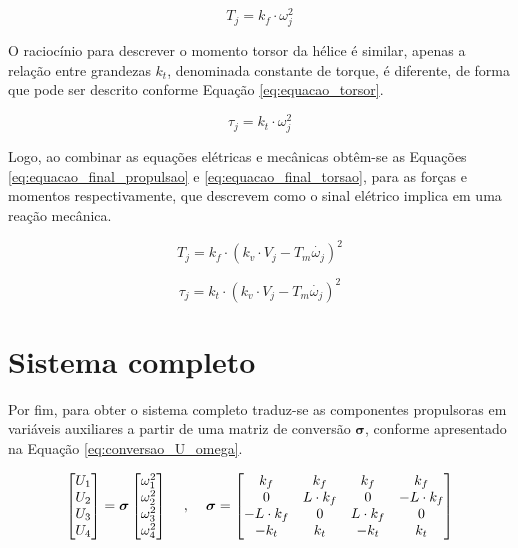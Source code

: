 \documentclass[main.tex]{subfiles}
\begin{document}
\begin{equation}\label{eq:equacao_propulsao}
	T_j = k_f \cdot \omega_j^2
\end{equation}

O raciocínio para descrever o momento torsor da hélice é similar, apenas a relação entre grandezas $k_t$, denominada constante de torque, é diferente, de forma que pode ser descrito conforme Equação \ref{eq:equacao_torsor}.

\begin{equation}\label{eq:equacao_torsor}
	\tau_j = k_t \cdot \omega_j^2
\end{equation}

Logo, ao combinar as equações elétricas e mecânicas obtêm-se as Equações \ref{eq:equacao_final_propulsao} e \ref{eq:equacao_final_torsao}, para as forças e momentos respectivamente, que descrevem como o sinal elétrico implica em uma reação mecânica.

\begin{equation}\label{eq:equacao_final_propulsao}
	T_j = k_f \cdot (k_v \cdot V_j - T_m\dot{\omega_j})^2
\end{equation}

\begin{equation}\label{eq:equacao_final_torsao}
	\tau_j = k_t \cdot (k_v \cdot V_j - T_m\dot{\omega_j})^2
\end{equation}

\section{Sistema completo}

Por fim, para obter o sistema completo traduz-se as componentes propulsoras em variáveis auxiliares a partir de uma matriz de conversão $\boldsymbol{\sigma}$, conforme apresentado na Equação \ref{eq:conversao_U_omega}.

\begin{equation}\label{eq:conversao_U_omega}
	\begin{bmatrix}
		U_1\\
		U_2\\
		U_3\\
		U_4
	\end{bmatrix} = 
	\boldsymbol{\sigma}
	\begin{bmatrix}
		\omega_1^2\\
		\omega_2^2\\
		\omega_3^2\\
		\omega_4^2
		\end{bmatrix}\hspace{0.4cm},\hspace{0.4cm}\boldsymbol{\sigma} = \begin{bmatrix}
		k_f		& k_f 	& k_f 	& k_f\\
		0 		& L\cdot k_f 	& 0 	& -L\cdot k_f\\
		-L\cdot k_f	& 0		& L\cdot k_f	& 0\\
		-k_t 	& k_t 	& -k_t 	& k_t\\
	\end{bmatrix}
\end{equation}
\end{document}
